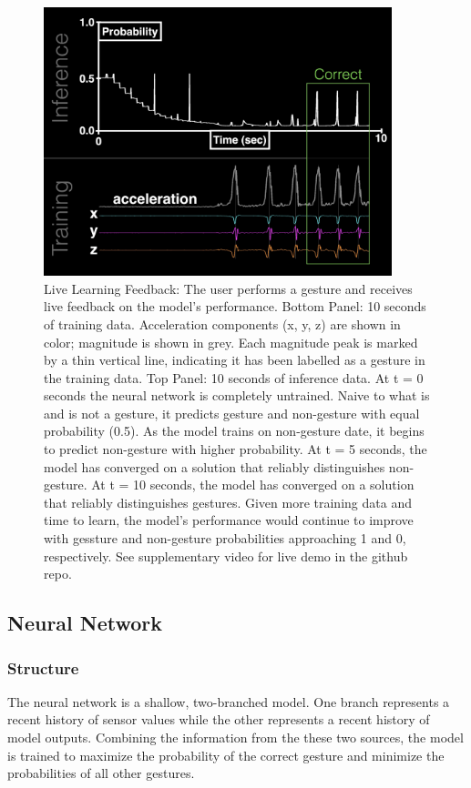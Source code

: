 \documentclass{article}
\begin{document}
\begin{figure}[h]
    \centering
    \includegraphics[width=0.9\textwidth]{../figures/realtime_training.jpg}
    \caption{Live Learning Feedback: The user performs a gesture and receives live feedback on the model's performance. Bottom Panel: 10 seconds of training data. Acceleration components (x, y, z) are shown in color; magnitude is shown in grey. Each magnitude peak is marked by a thin vertical line, indicating it has been labelled as a gesture in the training data. Top Panel: 10 seconds of inference data. At t = 0 seconds the neural network is completely untrained. Naive to what is and is not a gesture, it predicts gesture and non-gesture with equal probability (0.5). As the model trains on non-gesture date, it begins to predict non-gesture with higher probability. At t = 5 seconds, the model has converged on a solution that reliably distinguishes non-gesture. At t = 10 seconds, the model has converged on a solution that reliably distinguishes gestures. Given more training data and time to learn, the model's performance would continue to improve with gessture and non-gesture probabilities approaching 1 and 0, respectively. See supplementary video for live demo in the github repo.}
    \label{fig:realtime_training}
\end{figure}

\subsection{Neural Network}
\subsubsection{Structure}
The neural network is a shallow, two-branched model. One branch represents a recent history of sensor values while the other represents a recent history of model outputs. Combining the information from the these two sources, the model is trained to maximize the probability of the correct gesture and minimize the probabilities of all other gestures.
\end{document}
